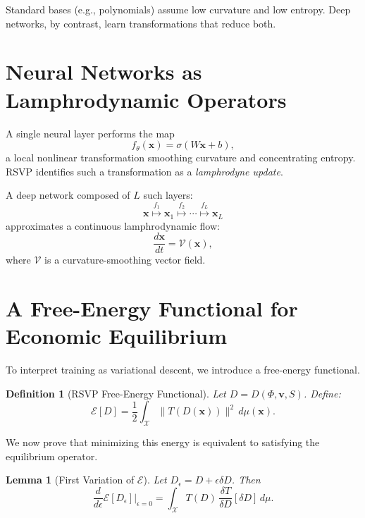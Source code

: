 \documentclass[12pt]{article}
\newtheorem{lemma}{Lemma}
\newtheorem{definition}{Definition}
\begin{document}
Standard bases (e.g., polynomials) assume low curvature and low entropy. 
Deep networks, by contrast, learn transformations that reduce both.

\section{Neural Networks as Lamphrodynamic Operators}

A single neural layer performs the map
\begin{equation}
    f_\theta(\mathbf{x}) = \sigma(W\mathbf{x}+b),
\end{equation}
a local nonlinear transformation smoothing curvature and concentrating 
entropy. RSVP identifies such a transformation as a 
\emph{lamphrodyne update}.

A deep network composed of $L$ such layers:
\[
\mathbf{x}
\stackrel{f_1}{\mapsto} \mathbf{x}_1
\stackrel{f_2}{\mapsto} \cdots
\stackrel{f_L}{\mapsto} \mathbf{x}_L
\]
approximates a continuous lamphrodynamic flow:
\begin{equation}
    \frac{d\mathbf{x}}{dt} = \mathcal{V}(\mathbf{x}),
\end{equation}
where $\mathcal{V}$ is a curvature-smoothing vector field.

\section{A Free-Energy Functional for Economic Equilibrium}

To interpret training as variational descent, we introduce a 
free-energy functional.

\begin{definition}[RSVP Free-Energy Functional]
Let $D = D(\Phi,\mathbf{v},S)$. Define:
\begin{equation}
\mathcal{E}[D]
    = \frac{1}{2}\int_{\mathcal{X}}
        \|T(D(\mathbf{x}))\|^2 \, d\mu(\mathbf{x}).
\end{equation}
\end{definition}

We now prove that minimizing this energy is equivalent to satisfying the 
equilibrium operator.

\begin{lemma}[First Variation of $\mathcal{E}$]
Let $D_\epsilon = D + \epsilon \delta D$. Then
\[
\frac{d}{d\epsilon}\mathcal{E}[D_\epsilon]\bigg|_{\epsilon=0}
    = \int_{\mathcal{X}}
        T(D)\,
        \frac{\delta T}{\delta D}[\delta D]
        \, d\mu.
\]
\end{lemma}
\end{document}
